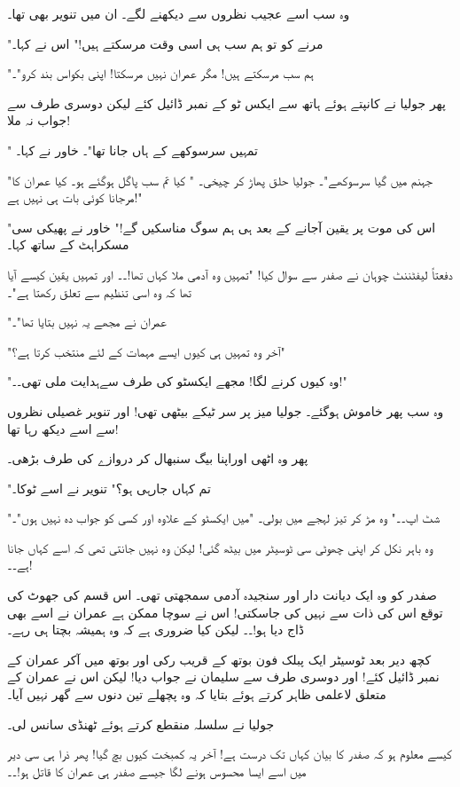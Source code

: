 وہ سب اسے عجیب نظروں سے دیکھنے لگے۔ ان میں تنویر بھی تھا۔

"مرنے کو تو ہم سب ہی اسی وقت مرسکتے ہیں!" اس نے کہا۔

"ہم سب مرسکتے ہیں! مگر عمران نہیں مرسکتا! اپنی بکواس بند کرو"۔

پھر جولیا نے کانپتے ہوئے ہاتھ سے ایکس ٹو کے نمبر ڈائیل کئے لیکن دوسری طرف سے جواب نہ ملا!

" تمہیں سرسوکھے کے ہاں جانا تھا"۔ خاور نے کہا۔

"جہنم میں گیا سرسوکھے"۔ جولیا حلق پھاڑ کر چیخی۔ " کیا تم سب پاگل ہوگئے ہو۔ کیا عمران کا مرجانا کوئی بات ہی نہیں ہے!"

"اس کی موت پر یقین آجانے کے بعد ہی ہم سوگ مناسکیں گے!" خاور نے پھیکی سی مسکراہٹ کے ساتھ کہا۔

دفعتاً لیفٹننٹ چوہان نے صفدر سے سوال کیا! "تمہیں وہ آدمی ملا کہاں تھا!۔۔ اور تمہیں یقین کیسے آیا تھا کہ وہ اسی تنظیم سے تعلق رکھتا ہے"۔

"عمران نے مجھے یہ نہیں بتایا تھا"۔

"آخر وہ تمہیں ہی کیوں ایسے مہمات کے لئے منتخب کرتا ہے؟"

"وہ کیوں کرنے لگا! مجھے ایکسٹو کی طرف سےہدایت ملی تھی۔۔!"

وہ سب پھر خاموش ہوگئے۔ جولیا میز پر سر ٹیکے بیٹھی تھی! اور تنویر غصیلی نظروں سے اسے دیکھ رہا تھا!

پھر وہ اٹھی اوراپنا بیگ سنبھال کر دروازے کی طرف بڑھی۔

"تم کہاں جارہی ہو؟" تنویر نے اسے ٹوکا۔

"شٹ اپ۔۔" وہ مڑ کر تیز لہجے میں بولی۔ "میں ایکسٹو کے علاوہ اور کسی کو جواب دہ نہیں ہوں"۔

وہ باہر نکل کر اپنی چھوٹی سی ٹوسیٹر میں بیٹھ گئی! لیکن وہ نہیں جانتی تھی کہ اسے کہاں جانا ہے۔۔!

صفدر کو وہ ایک دیانت دار اور سنجیدہ آدمی سمجھتی تھی۔ اس قسم کی جھوٹ کی توقع اس کی ذات سے نہیں کی جاسکتی! اس نے سوچا ممکن ہے عمران نے اسے بھی ڈاج دیا ہو!۔۔ لیکن کیا ضروری ہے کہ وہ ہمیشہ بچتا ہی رہے۔

کچھ دیر بعد ٹوسیٹر ایک پبلک فون بوتھ کے قریب رکی اور بوتھ میں آکر عمران کے نمبر ڈائیل کئے! اور دوسری طرف سے سلیمان نے جواب دیا! لیکن اس نے عمران کے متعلق لاعلمی ظاہر کرتے ہوئے بتایا کہ وہ پچھلے تین دنوں سے گھر نہیں آیا۔

جولیا نے سلسلہ منقطع کرتے ہوئے ٹھنڈی سانس لی۔

کیسے معلوم ہو کہ صفدر کا بیان کہاں تک درست ہے! آخر یہ کمبخت کیوں بچ گیا! پھر ذرا ہی سی دیر میں اسے ایسا محسوس ہونے لگا جیسے صفدر ہی عمران کا قاتل ہو!۔۔

